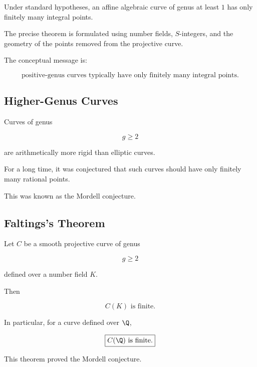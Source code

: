 \begin{theorem}[Siegel]
Under standard hypotheses, an affine algebraic curve of genus at least \(1\)
has only finitely many integral points.
\end{theorem}

The precise theorem is formulated using number fields, \(S\)-integers, and
the geometry of the points removed from the projective curve.

The conceptual message is:

\[
\boxed{
\text{positive-genus curves typically have only finitely many integral points}.
}
\]

\subsection{Higher-Genus Curves}
\label{subsec:higher-genus-curves}

Curves of genus

\[ g\geq2 \]

are arithmetically more rigid than elliptic curves.

For a long time, it was conjectured that such curves should have only
finitely many rational points.

This was known as the Mordell conjecture.

\subsection{Faltings's Theorem}
\label{subsec:faltings-theorem}

\begin{theorem}[Faltings]
Let \(C\) be a smooth projective curve of genus

\[ g\geq2 \]

defined over a number field \(K\).

Then

\[ \boxed{C(K)\text{ is finite}.} \]
\end{theorem}

In particular, for a curve defined over \(\Q\),

\[ \boxed{C(\Q)\text{ is finite}.} \]

This theorem proved the Mordell conjecture.

